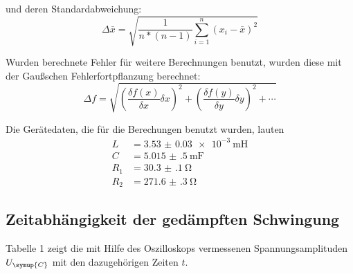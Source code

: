 und deren Standardabweichung:
\begin{equation}
  \Delta\bar{x} = \sqrt{\frac{1}{n*(n-1)}\sum\limits_{i=1}^n (x_i - \bar{x})^2}
\end{equation}

Wurden berechnete Fehler für weitere Berechnungen benutzt, wurden diese mit der Gaußschen Fehlerfortpflanzung
berechnet:
\begin{equation}
  \Delta f = \sqrt{(\frac{\delta f(x)}{\delta x}\delta x)^2 + (\frac{\delta f(y)}{\delta y}\delta y)^2 + \cdots}
\end{equation}

Die Gerätedaten, die für die Berechungen benutzt wurden, lauten
\begin{align*}
  L & = \SI{3.53(3)e-3}{\milli\henry} \\
  C & = \SI{5.015(500)}{\milli\farad} \\
  R_1 & = \SI{30.3(1)}{\ohm} \\
  R_2 & = \SI{271.6(3)}{\ohm}
\end{align*}

\subsection{Zeitabhängigkeit der gedämpften Schwingung}
Tabelle 1 zeigt die mit Hilfe des Oszilloskops vermessenen Spannungsamplituden $U_\symup{C}$ mit den dazugehörigen
Zeiten $t$.

